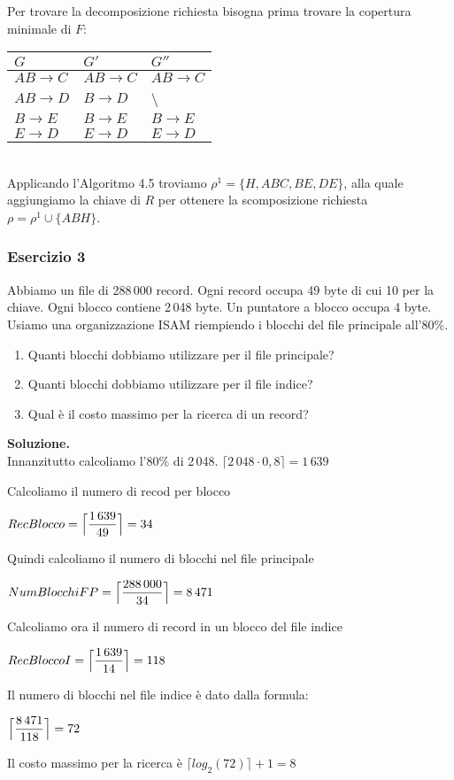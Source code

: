 \noindent Per trovare la decomposizione richiesta bisogna prima trovare la copertura minimale di $F$:\\
 
 \begin{tabular}{l|l|l}
 $G$ & $G'$ & $G''$\\
 \hline
 $AB \rightarrow C$ & $AB \rightarrow C$ & $AB \rightarrow C$\\
 $AB \rightarrow D$ & $B \rightarrow D$ & \textbackslash \\
 $B \rightarrow E$ & $B \rightarrow E$ & $B \rightarrow E$\\
 $E \rightarrow D$ & $E \rightarrow D$ & $E \rightarrow D$\\
 \end{tabular}\\
 
 \noindent Applicando l'Algoritmo 4.5 troviamo $\rho^1= \{H, ABC, BE, DE\}$, alla quale aggiungiamo la chiave di $R$
 per ottenere la scomposizione richiesta $\rho = \rho^1 \cup \{ABH\}$.
 
\subsubsection{Esercizio 3}
Abbiamo un file di 288\,000 record. Ogni record occupa 49 byte di cui 10 per la chiave. Ogni blocco contiene 2\,048 byte.
Un puntatore a blocco occupa 4 byte. Usiamo una organizzazione ISAM riempiendo i blocchi del file principale all'$80\%$.
\begin{enumerate}
 \item  Quanti blocchi dobbiamo utilizzare per il file principale? 
 \item Quanti blocchi dobbiamo utilizzare per il file indice?
 \item Qual è il costo massimo per la ricerca di un record? 
\end{enumerate}

\noindent\textbf{\fontsize{14pt}{1em}Soluzione.}\\
Innanzitutto calcoliamo l'$80\%$ di 2\,048. $\lceil2\,048 \cdot 0,8\rceil = 1\,639$

Calcoliamo il numero di recod per blocco
\begin{center}
 $RecBlocco = \Bigl\lceil \dfrac{1\,639}{49} \Bigr\rceil = 34$\\
\end{center}
Quindi calcoliamo il numero di blocchi nel file principale
\begin{center}
 $NumBlocchiFP = \Bigl\lceil \dfrac{288\,000}{34} \Bigr\rceil = 8\,471$\\
\end{center}
Calcoliamo ora il numero di record in un blocco del file indice
\begin{center}
 $RecBloccoI = \Bigl\lceil \dfrac{1\,639}{14} \Bigr\rceil = 118$\\
\end{center}
Il numero di blocchi nel file indice è dato dalla formula:
\begin{center}
 $\Bigl\lceil \dfrac{8\,471}{118} \Bigr\rceil = 72$
\end{center}
Il costo massimo per la ricerca è $\lceil log_2(72)\rceil + 1 = 8$
  
 





